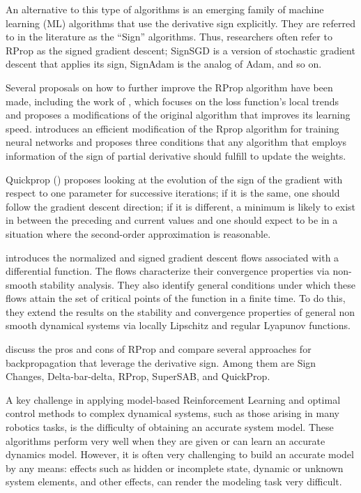 \documentclass[11pt]{book}
\begin{document}
An alternative to this type of algorithms is an emerging family of
machine learning (ML) algorithms that use the derivative sign explicitly.
They are referred to in the literature as the ``Sign'' algorithms.
Thus, researchers often refer to RProp as the signed gradient descent;
SignSGD is a version of stochastic gradient descent that applies its
sign, SignAdam is the analog of Adam, and so on.

Several proposals on how to further improve the RProp algorithm have
been made, including the work of \cite{igel2003empirical}, which
focuses on the loss function's local trends and proposes a modifications of the original algorithm that improves its learning speed. \cite{anastasiadis2003efficient} introduces an efficient modification of the
Rprop algorithm for training neural networks
and proposes three conditions that any algorithm that employs information
of the sign of partial derivative should fulfill to update the weights.

Quickprop (\cite{roux2005optimization}) proposes looking  at the evolution of the sign of the gradient with respect to
one parameter for successive iterations; if it is the same, one should
follow the gradient descent direction; if it is different, a minimum
is likely to exist in between the preceding and current values and
one should expect to be in a situation where the second-order approximation
is reasonable.

\cite{cortes2005achieving} introduces the normalized and signed gradient
descent flows associated with a differential function. The flows characterize
their convergence properties via non-smooth stability analysis. They
also identify general conditions under which these flows attain the
set of critical points of the function in a finite time. To do this,
they extend the results on the stability and convergence properties
of general non smooth dynamical systems via locally Lipschitz and
regular Lyapunov functions.

\cite{zainuddin2005improving,prasad2013comparison,mushgil2015comparison}
discuss the pros and cons of RProp and compare several approaches
for backpropagation that leverage the derivative sign. Among them
are \textquotedbl Sign Changes,\textquotedbl{} \textquotedbl Delta-bar-delta,\textquotedbl{}
\textquotedbl RProp,\textquotedbl{} \textquotedbl SuperSAB,\textquotedbl{}
and \textquotedbl QuickProp.\textquotedbl{}

A key challenge in applying model-based Reinforcement Learning and
optimal control methods to complex dynamical systems, such as those
arising in many robotics tasks, is the difficulty of obtaining an
accurate system model. These algorithms perform very well when they
are given or can learn an accurate dynamics model. However, it is
often very challenging to build an accurate model by any means: effects
such as hidden or incomplete state, dynamic or unknown system elements,
and other effects, can render the modeling task very difficult.
\end{document}
